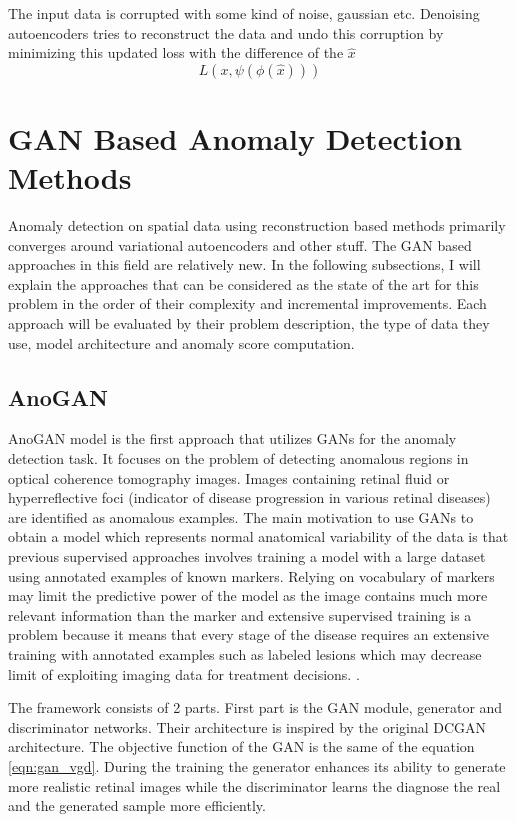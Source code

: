 The input data is corrupted with some kind of noise, gaussian etc. Denoising autoencoders tries to
reconstruct the data and undo this corruption by minimizing this updated loss with the difference of
the $\hat{x}$
$$
L(x, \psi(\phi(\hat{x})))
$$

\section{GAN Based Anomaly Detection Methods}
\label{sec:gan_based_sota}
Anomaly detection on spatial data using reconstruction based methods primarily converges around
variational autoencoders and other stuff. The GAN based approaches in this field are relatively new.
In the following subsections, I will explain the approaches that can be considered as the state of
the art for this problem in the order of their complexity and incremental improvements. Each
approach will be evaluated by their problem description, the type of data they use, model
architecture and anomaly score computation. 

\subsection{AnoGAN}
\label{sec:anogan}

AnoGAN model is the first approach that utilizes GANs for the anomaly detection task.
\cite{Schlegl2017UnsupervisedAD} It focuses on the problem of detecting anomalous regions in optical
coherence tomography images. Images containing retinal fluid or hyperreflective foci (indicator of
disease progression in various retinal diseases) are identified as anomalous examples. The main
motivation to use GANs to obtain a model which represents normal anatomical variability of the data
is that previous supervised approaches involves training a model with a large dataset using
annotated examples of known markers. Relying on vocabulary of markers may limit the predictive power
of the model as the image contains much more relevant information than the marker and extensive
supervised training is a problem because it means that every stage of the disease requires an
extensive training with annotated examples such as labeled lesions which may decrease limit of
exploiting imaging data for treatment decisions. \cite{Schlegl2017UnsupervisedAD}.

The framework consists of 2 parts. First part is the GAN module, generator and discriminator
networks. Their architecture is inspired by the original DCGAN
architecture\cite{Radford2016UnsupervisedRL}. The objective function of the GAN is the same of the
equation \ref{eqn:gan_vgd}. During the training the generator enhances its ability to generate more realistic
retinal images while the discriminator learns the diagnose the real and the generated sample more
efficiently. 

